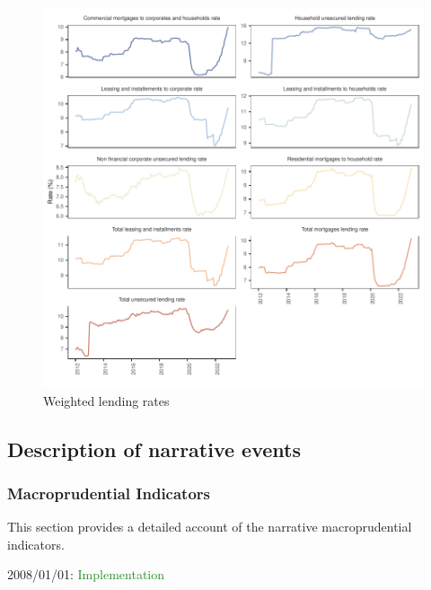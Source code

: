 \documentclass[
  letterpaper,
  DIV=11,
  numbers=noendperiod]{scrartcl}
\begin{document}
\begin{figure}[H]

{\centering \includegraphics{UP_paper_files/figure-pdf/fig-bank_interest_rates-1.pdf}

}

\caption{\label{fig-bank_interest_rates}Weighted lending rates}

\end{figure}

\newpage

\hypertarget{description-of-narrative-events}{%
\subsection{Description of narrative
events}\label{description-of-narrative-events}}

\hypertarget{macroprudential-indicators}{%
\subsubsection{Macroprudential
Indicators}\label{macroprudential-indicators}}

This section provides a detailed account of the narrative
macroprudential indicators.

2008/01/01: \textcolor{ForestGreen}{Implementation}
\end{document}
